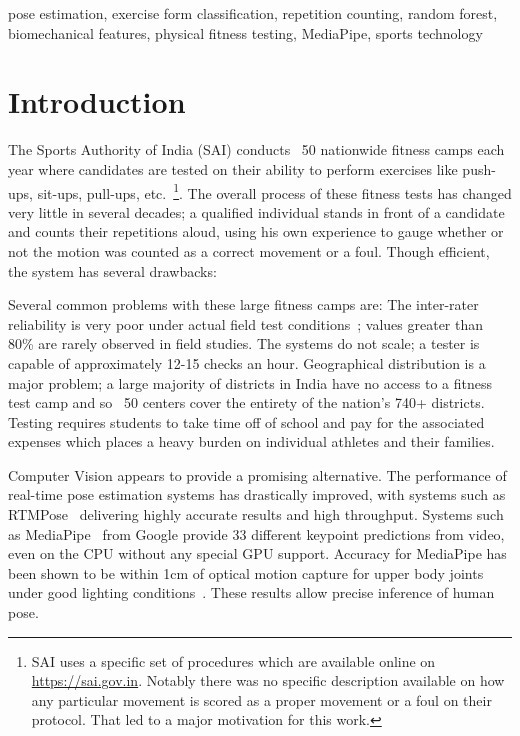 \documentclass[conference]{IEEEtran}
\begin{document}
\begin{IEEEkeywords}
pose estimation, exercise form classification, repetition counting, random forest, biomechanical features, physical fitness testing, MediaPipe, sports technology
\end{IEEEkeywords}

\section{Introduction}

The Sports Authority of India (SAI) conducts ~50 nationwide fitness camps each year where candidates are tested on their ability to perform exercises like push-ups, sit-ups, pull-ups, etc.~\cite{sai2023}\footnote{SAI uses a specific set of procedures which are available online on \url{https://sai.gov.in}. Notably there was no specific description available on how any particular movement is scored as a proper movement or a foul on their protocol. That led to a major motivation for this work.}. The overall process of these fitness tests has changed very little in several decades; a qualified individual stands in front of a candidate and counts their repetitions aloud, using his own experience to gauge whether or not the motion was counted as a correct movement or a foul. Though efficient, the system has several drawbacks:

Several common problems with these large fitness camps are: The inter-rater reliability is very poor under actual field test conditions~\cite{acft2022}; values greater than 80\% are rarely observed in field studies. The systems do not scale; a tester is capable of approximately 12-15 checks an hour. Geographical distribution is a major problem; a large majority of districts in India have no access to a fitness test camp and so ~50 centers cover the entirety of the nation's 740+ districts. Testing requires students to take time off of school and pay for the associated expenses which places a heavy burden on individual athletes and their families.

Computer Vision appears to provide a promising alternative. The performance of real-time pose estimation systems has drastically improved, with systems such as RTMPose~\cite{rtmpose2023} delivering highly accurate results and high throughput. Systems such as MediaPipe~\cite{bazarevsky2020,lugaresi2019} from Google provide 33 different keypoint predictions from video, even on the CPU without any special GPU support. Accuracy for MediaPipe has been shown to be within 1cm of optical motion capture for upper body joints under good lighting conditions~\cite{kim2023}. These results allow precise inference of human pose.
\end{document}

